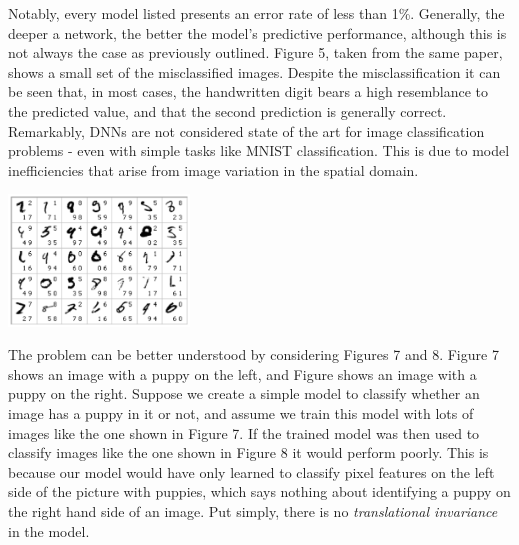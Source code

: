 \documentclass[a4paper]{article}
\begin{document}
\vspace{0.5cm}

\begin{minipage}{0.45\textwidth}
Notably, every model listed presents an error rate of less than 1\%. Generally, the deeper a network, the better the model's predictive performance, although this is not always the case as previously outlined. Figure 5, taken from the same paper, shows a small set of the misclassified images. Despite the misclassification it can be seen that, in most cases, the handwritten digit bears a high resemblance to the predicted value, and that the second prediction is generally correct. Remarkably, DNNs are not considered state of the art for image classification problems - even with simple tasks like MNIST classification. This is due to model inefficiencies that arise from image variation in the spatial domain.
\end{minipage}
\hspace{1cm}
\begin{minipage}{0.45\textwidth}
\centering
\includegraphics[height=3.5cm]{misclassification}
\end{minipage}

\vspace{0.5cm}

The problem can be better understood by considering Figures 7 and 8. Figure 7 shows an image with a puppy on the left, and Figure shows an image with a puppy on the right. Suppose we create a simple model to classify whether an image has a puppy in it or not, and assume we train this model with lots of images like the one shown in Figure 7. If the trained model was then used to classify images like the one shown in Figure 8 it would perform poorly. This is because our model would have only learned to classify pixel features on the left side of the picture with puppies, which says nothing about identifying a puppy on the right hand side of an image. Put simply, there is no \textit{translational invariance} in the model.
\end{document}
